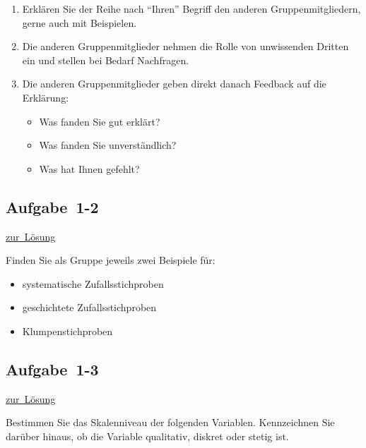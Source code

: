 \documentclass[
  11pt,
  ngerman,
  a4paper,
]{report}
\providecommand{\tightlist}{%
  \setlength{\itemsep}{0pt}\setlength{\parskip}{0pt}}
\begin{document}
\begin{enumerate}
\def\labelenumi{\arabic{enumi}.}
\tightlist
\item
  Erklären Sie der Reihe nach \enquote{Ihren} Begriff den anderen Gruppenmitgliedern, gerne auch mit Beispielen.
\item
  Die anderen Gruppenmitglieder nehmen die Rolle von unwissenden Dritten ein und stellen bei Bedarf Nachfragen.
\item
  Die anderen Gruppenmitglieder geben direkt danach Feedback auf die Erklärung:

  \begin{itemize}
  \tightlist
  \item
    Was fanden Sie gut erklärt?
  \item
    Was fanden Sie unverständlich?
  \item
    Was hat Ihnen gefehlt?
  \end{itemize}
\end{enumerate}

\hypertarget{aufgabe-1-2}{%
\subsection{Aufgabe~1-2}\label{aufgabe-1-2}}

\protect\hyperlink{loesung-1-2}{zur~Lösung}

Finden Sie als Gruppe jeweils zwei Beispiele für:

\begin{itemize}
\tightlist
\item
  systematische Zufallsstichproben
\item
  geschichtete Zufallsstichproben
\item
  Klumpenstichproben
\end{itemize}

\hypertarget{aufgabe-1-3}{%
\subsection{Aufgabe~1-3}\label{aufgabe-1-3}}

\protect\hyperlink{loesung-1-3}{zur~Lösung}

Bestimmen Sie das Skalenniveau der folgenden Variablen. Kennzeichnen Sie darüber hinaus, ob die Variable qualitativ, diskret oder stetig ist.
\end{document}
